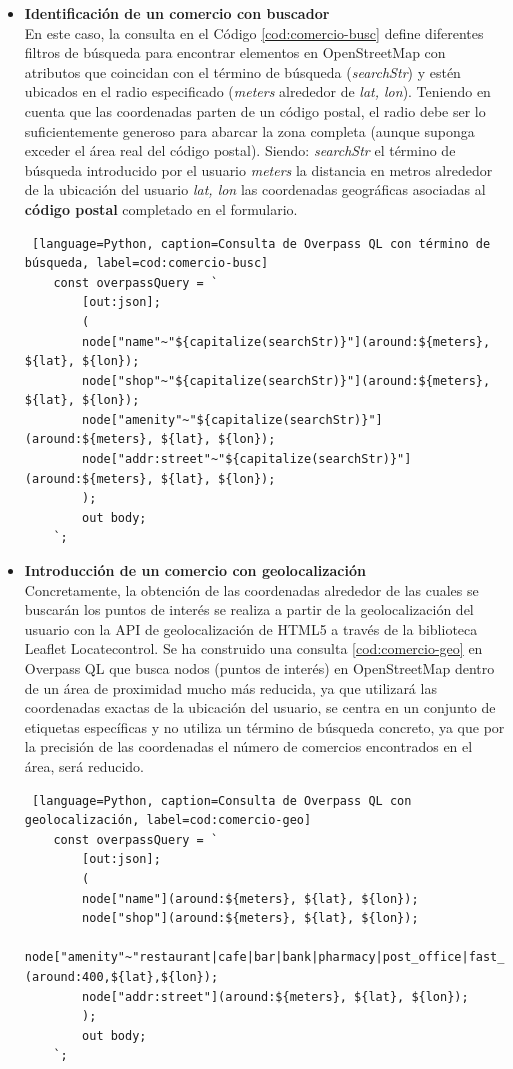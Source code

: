 \begin{itemize}
    \item \textbf{Identificación de un comercio con buscador}\\    
    En este caso, la consulta en el Código \ref{cod:comercio-busc} define diferentes filtros de búsqueda para encontrar elementos en OpenStreetMap con atributos que coincidan con el término de búsqueda (\textit{searchStr}) y estén ubicados en el radio especificado (\textit{meters} alrededor de \textit{lat, lon}). Teniendo en cuenta que las coordenadas parten de un código postal, el radio debe ser lo suficientemente generoso para abarcar la zona completa (aunque suponga exceder el área real del código postal). Siendo:
    \subitem \textit{searchStr} el término de búsqueda introducido por el usuario
    \subitem \textit{meters} la distancia en metros alrededor de la ubicación del usuario
    \subitem \textit{lat, lon} las coordenadas geográficas asociadas al \textbf{código postal} completado en el formulario.
    
    \begin{lstlisting} [language=Python, caption=Consulta de Overpass QL con término de búsqueda, label=cod:comercio-busc]
    const overpassQuery = `
        [out:json];
        (
        node["name"~"${capitalize(searchStr)}"](around:${meters}, ${lat}, ${lon});
        node["shop"~"${capitalize(searchStr)}"](around:${meters}, ${lat}, ${lon});
        node["amenity"~"${capitalize(searchStr)}"](around:${meters}, ${lat}, ${lon});
        node["addr:street"~"${capitalize(searchStr)}"](around:${meters}, ${lat}, ${lon});
        );
        out body;
    `;
    \end{lstlisting}

    \item \textbf{Introducción de un comercio con geolocalización}\\ 
    Concretamente, la obtención de las coordenadas alrededor de las cuales se buscarán los puntos de interés se realiza a partir de la geolocalización del usuario con la API de geolocalización de HTML5 a través de la biblioteca Leaflet Locatecontrol. Se ha construido una consulta \ref{cod:comercio-geo} en Overpass QL que busca nodos (puntos de interés) en OpenStreetMap dentro de un área de proximidad mucho más reducida, ya que utilizará las coordenadas exactas de la ubicación del usuario, se centra en un conjunto de etiquetas específicas y no utiliza un término de búsqueda concreto, ya que por la precisión de las coordenadas el número de comercios encontrados en el área, será reducido.
    \begin{lstlisting} [language=Python, caption=Consulta de Overpass QL con geolocalización, label=cod:comercio-geo]
    const overpassQuery = `
        [out:json];
        (
        node["name"](around:${meters}, ${lat}, ${lon});
        node["shop"](around:${meters}, ${lat}, ${lon});
        node["amenity"~"restaurant|cafe|bar|bank|pharmacy|post_office|fast_food|clinic|vending_machine"](around:400,${lat},${lon});
        node["addr:street"](around:${meters}, ${lat}, ${lon});               
        );
        out body;
    `;
    \end{lstlisting}

\end{itemize}

